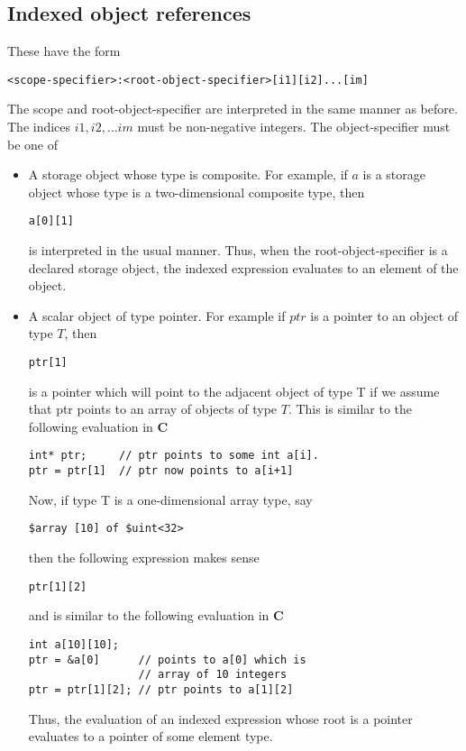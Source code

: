 \documentclass{article}
\begin{document}
\subsection{Indexed object references}

These have the form
\begin{verbatim}
<scope-specifier>:<root-object-specifier>[i1][i2]...[im]
\end{verbatim}
The scope and root-object-specifier are interpreted in the
same manner as before.  The indices $i1,i2, \ldots im$
must be non-negative integers.   The 
object-specifier must be one of
\begin{itemize}
\item A storage object whose type is composite.  For
example, if $a$ is a storage object whose
type is a two-dimensional composite type, then 
\begin{verbatim}
a[0][1]
\end{verbatim}
is interpreted in the usual manner.  Thus, when
the root-object-specifier is a declared storage
object, the indexed expression evaluates to an
element of the object.
\item A scalar object of type pointer.  For example if $ptr$ is a pointer
to an object of type $T$, then
\begin{verbatim}
ptr[1]
\end{verbatim}
is a pointer which will point to the adjacent object
of type T if we assume that ptr points to an array
of objects of type $T$.  This is similar to the following
evaluation in {\bf C}
\begin{verbatim}
int* ptr;     // ptr points to some int a[i].
ptr = ptr[1]  // ptr now points to a[i+1] 
\end{verbatim}
Now, if type T is a one-dimensional array type,
say
\begin{verbatim}
$array [10] of $uint<32>
\end{verbatim}
then the following expression makes sense
\begin{verbatim}
ptr[1][2]
\end{verbatim}
and is similar to the following evaluation in {\bf C}
\begin{verbatim}
int a[10][10];
ptr = &a[0]      // points to a[0] which is
                 // array of 10 integers
ptr = ptr[1][2]; // ptr points to a[1][2]
\end{verbatim} 
Thus, the evaluation of an indexed expression
whose root is a pointer evaluates to a
pointer of some element type.
\end{itemize}
\end{document}
